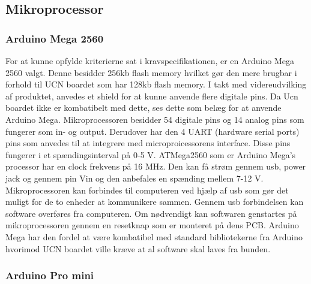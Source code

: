 \subsection{Mikroprocessor}
\subsubsection{Arduino Mega 2560}
For at kunne opfylde kriterierne sat i kravspecifikationen, er en Arduino Mega 2560 valgt. Denne besidder 256kb flash memory hvilket gør den mere brugbar i forhold til UCN boardet som har 128kb flash memory. I takt med videreudvilking af produktet, anvedes et shield for at kunne anvende flere digitale pins. Da Ucn boardet ikke er kombatibelt med dette, ses dette som belæg for at anvende Arduino Mega. 
Mikroprocessoren besidder 54 digitale pins og 14 analog pins som fungerer som in- og output. Derudover har den 4 UART (hardware serial ports) pins som anvedes til at integrere med microproicessorens interface. Disse pins fungerer i et spændingsinterval på 0-5 V. ATMega2560 som er Arduino Mega's processor har en clock frekvens på 16 MHz. Den kan få strøm gennem usb, power jack og gennem pin Vin og den anbefales en spænding mellem 7-12 V. 
Mikroprocessoren kan forbindes til computeren ved hjælp af usb som gør det muligt for de to enheder at kommunikere sammen. Gennem usb forbindelsen kan software overføres fra computeren. Om nødvendigt kan softwaren genstartes på mikroprocessoren gennem en resetknap som er monteret på dens PCB. 
Arduino Mega har den fordel at være kombatibel med standard bibliotekerne fra Arduino hvorimod UCN boardet ville kræve at al software skal laves fra bunden. 



\subsubsection{Arduino Pro mini}
